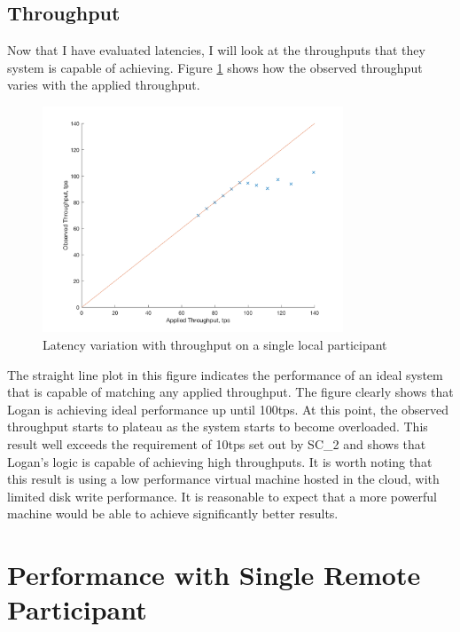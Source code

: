 \documentclass[12pt,a4paper,twoside,openright]{report}
\begin{document}
	\subsection{Throughput}
	Now that I have evaluated latencies, I will look at the throughputs that they system is capable of achieving.
	Figure \ref{fig:singlocal} shows how the observed throughput varies with the applied throughput.  
	\begin{figure}
		\centering
		\includegraphics[width=0.8\textwidth]{figs/appliedvsobservedlocal.png}
		\caption{Latency variation with throughput on a single local participant}
		\label{fig:singlocal}
	\end{figure}
	The straight line plot in this figure indicates the performance of an ideal system that is capable of matching any applied throughput.
	The figure clearly shows that Logan is achieving ideal performance up until 100tps.
	At this point, the observed throughput starts to plateau as the system starts to become overloaded. 
	This result well exceeds the requirement of 10tps set out by SC\_2 and shows that Logan's logic is capable of achieving high throughputs.
	It is worth noting that this result is using a low performance virtual machine hosted in the cloud, with limited disk write performance. 
	It is reasonable to expect that a more powerful machine would be able to achieve significantly better results.\\

	\section{Performance with Single Remote Participant}
\end{document}
